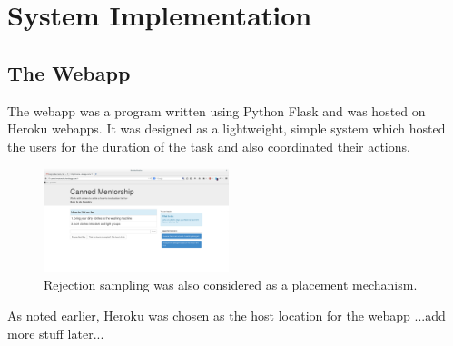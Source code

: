 \section{System Implementation}

\subsection{The Webapp}
The webapp was a program written using Python Flask and was hosted on Heroku webapps. 
It was designed as a lightweight, simple system which hosted the users for the duration of the task and also coordinated their actions.

\begin{figure}[h]
	\begin{center}
		\includegraphics[width=0.48\textwidth]{figures/cmInterface.png}
		\caption{Rejection sampling was also considered as a placement mechanism.}
		\label{fig:rejection_sampling_placement}
	\end{center}
\end{figure}

As noted earlier, Heroku was chosen as the host location for the webapp ...add more stuff later...




%

